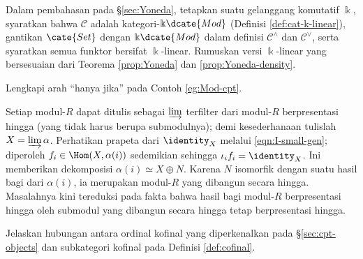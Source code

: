 \begin{Exercises}
	\item Dalam pembahasan pada \S\ref{sec:Yoneda}, tetapkan suatu gelanggang komutatif $\Bbbk$, syaratkan bahwa $\mathcal{C}$ adalah kategori-$\Bbbk\dcate{Mod}$ (Definisi \ref{def:cat-k-linear}), gantikan $\cate{Set}$ dengan $\Bbbk\dcate{Mod}$ dalam definisi $\mathcal{C}^\wedge$ dan $\mathcal{C}^\vee$, serta syaratkan semua funktor bersifat $\Bbbk$-linear. Rumuskan versi $\Bbbk$-linear yang bersesuaian dari Teorema \ref{prop:Yoneda} dan \ref{prop:Yoneda-density}.
	
	\item Lengkapi arah ``hanya jika'' pada Contoh \ref{eg:Mod-cpt}.
	\begin{hint}
		Setiap modul-$R$ dapat ditulis sebagai $\varinjlim$ terfilter dari modul-$R$ berpresentasi hingga (yang tidak harus berupa submodulnya); demi kesederhanaan tulislah $X = \varinjlim \alpha$. Perhatikan prapeta dari $\identity_X$ melalui \eqref{eqn:I-small-gen}; diperoleh $f_i \in \Hom(X, \alpha(i))$ sedemikian sehingga $\iota_i f_i = \identity_X$. Ini memberikan dekomposisi $\alpha(i) \simeq X \oplus N$. Karena $N$ isomorfik dengan suatu hasil bagi dari $\alpha(i)$, ia merupakan modul-$R$ yang dibangun secara hingga. Masalahnya kini tereduksi pada fakta bahwa hasil bagi modul-$R$ berpresentasi hingga oleh submodul yang dibangun secara hingga tetap berpresentasi hingga.
	\end{hint}
	
	\item Jelaskan hubungan antara ordinal kofinal yang diperkenalkan pada \S\ref{sec:cpt-objects} dan subkategori kofinal pada Definisi \ref{def:cofinal}.
	

\end{Exercises}
